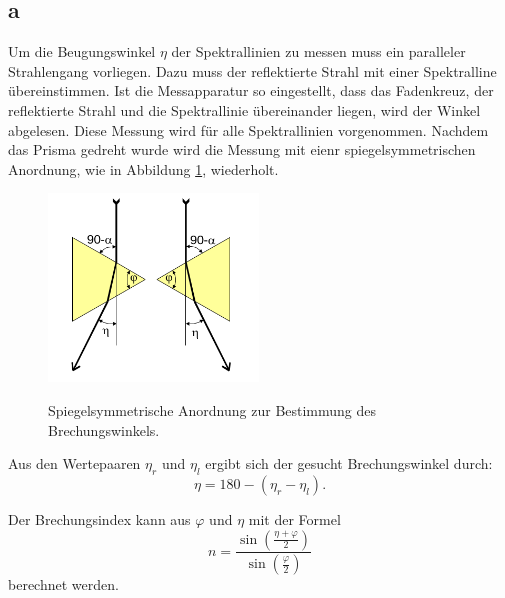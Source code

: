 \subsection{a}%
Um die Beugungswinkel $\eta$ der Spektrallinien zu messen muss ein
paralleler Strahlengang vorliegen. Dazu muss der reflektierte
Strahl mit einer Spektralline übereinstimmen. Ist die Messapparatur
so eingestellt, dass das Fadenkreuz, der reflektierte Strahl und die
Spektrallinie übereinander liegen, wird der Winkel abgelesen.
Diese Messung wird für alle Spektrallinien vorgenommen.
Nachdem das Prisma gedreht wurde wird die Messung mit eienr
spiegelsymmetrischen Anordnung, wie in Abbildung
\ref{fig:spiegel}, wiederholt.

\begin{figure}[H]
  \centering
  \includegraphics[height=5cm]{spiegel.png}
  \caption{Spiegelsymmetrische Anordnung zur Bestimmung des Brechungswinkels.}
  \label{fig:spiegel}
  \cite{skript}
\end{figure}

Aus den Wertepaaren $\eta_r$ und $\eta_l$ ergibt sich der gesucht
Brechungswinkel durch:
\begin{equation}
  \eta=180-(\eta_r - \eta_l).
  \label{eqn:eta}
\end{equation}

Der Brechungsindex kann aus $\varphi$ und $\eta$ mit der Formel
\begin{equation}
  n=\frac{\sin{(\frac{\eta+\varphi}{2})}}{\sin{(\frac{\varphi}{2})}}
  \label{eqn:brechungsindex}
\end{equation}
berechnet werden.
